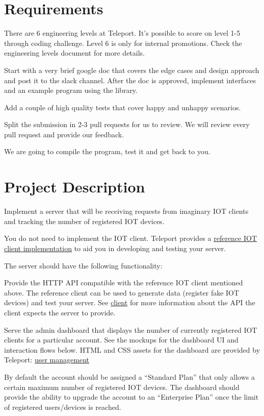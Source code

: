 \documentclass{article}
\begin{document}
\section{Requirements} 

  There are 6 engineering levels at Teleport. It's possible to score on level 1-5 through coding challenge.
  Level 6 is only for internal promotions. Check the engineering levels document for more details.

  Start with a very brief google doc that covers the edge cases and design approach and post it to the slack channel. After the doc is approved, implement interfaces and an example program using the library.

  Add a couple of high quality tests that cover happy and unhappy scenarios.

  Split the submission in 2-3 pull requests for us to review. We will review every pull request and provide our feedback.

  We are going to compile the program, test it and get back to you.

  \section{Project Description}
  
  Implement a server that will be receiving requests from imaginary IOT clients and tracking the number of registered IOT devices.

  You do not need to implement the IOT client. Teleport provides a \href{https://github.com/gravitational/fakeiot}{reference IOT client implementation} to aid you in developing and testing your server.

  The server should have the following functionality:

  Provide the HTTP API compatible with the reference IOT client mentioned above. The reference client can be used to generate data (register fake IOT devices) and test your server. See \href{https://github.com/gravitational/fakeiot}{client} for more information about the API the client expects the server to provide.

Serve the admin dashboard that displays the number of currently registered IOT clients for a particular account. See the mockups for the dashboard UI and interaction flows below. HTML and CSS assets for the dashboard are provided by Teleport: \href{https://github.com/gravitational/challenge-user-management}{user management}

By default the account should be assigned a “Standard Plan” that only allows a certain maximum number of registered IOT devices. The dashboard should provide the ability to upgrade the account to an “Enterprise Plan” once the limit of registered users/devices is reached.
  
\end{document}
